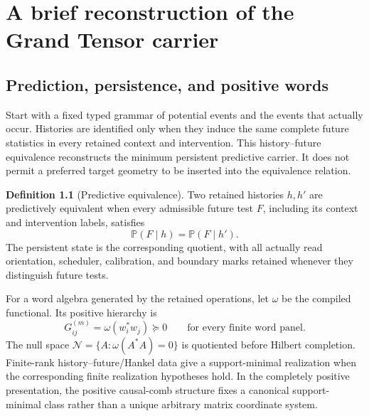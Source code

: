\documentclass[11pt,a4paper,oneside]{book}
\theoremstyle{plain}
\theoremstyle{definition}
\newtheorem{definition}[theorem]{Definition}
\theoremstyle{remark}
\begin{document}
\chapter{A brief reconstruction of the Grand Tensor carrier}
\label{ch:finite}
\section{Prediction, persistence, and positive words}
Start with a fixed typed grammar of potential events and the events that actually occur. Histories are identified only when they induce the same complete future statistics in every retained context and intervention. This history--future equivalence reconstructs the minimum persistent predictive carrier. It does not permit a preferred target geometry to be inserted into the equivalence relation.

\begin{definition}[Predictive equivalence]
Two retained histories $h,h'$ are predictively equivalent when every admissible future test $F$, including its context and intervention labels, satisfies
\begin{equation}
 \mathbb P(F\mid h)=\mathbb P(F\mid h').
 \label{eq:predictive-equivalence}
\end{equation}
The persistent state is the corresponding quotient, with all actually read orientation, scheduler, calibration, and boundary marks retained whenever they distinguish future tests.
\end{definition}

For a word algebra generated by the retained operations, let $\omega$ be the compiled functional. Its positive hierarchy is
\begin{equation}
 G^{(m)}_{ij}=\omega(w_i^*w_j)\succeq0
 \qquad\text{for every finite word panel.}
 \label{eq:word-gram}
\end{equation}
The null space $\mathcal N=\{A:\omega(A^*A)=0\}$ is quotiented before Hilbert completion. Finite-rank history--future/Hankel data give a support-minimal realization when the corresponding finite realization hypotheses hold. In the completely positive presentation, the positive causal-comb structure fixes a canonical support-minimal class rather than a unique arbitrary matrix coordinate system.
\end{document}
